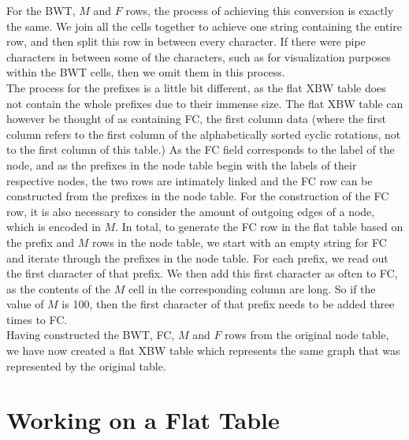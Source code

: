 \documentclass[a4paper,12pt,twoside,BCOR=10mm]{scrbook}
\begin{document}
For the BWT, $ M $ and $ F $ rows, the process of achieving this conversion is exactly the same. 
We join all the cells together to achieve one string containing the entire 
row, and then split this row in between every character. 
If there were pipe characters in between some of the characters, such as 
for visualization purposes within the BWT cells, then we omit them in this process. \\
The process for the prefixes is a little bit different, as the flat XBW table does 
not contain the whole prefixes due to their immense size. 
The flat XBW table can however be thought of as containing FC, the first column data (where 
the first column refers to the first column of the alphabetically sorted cyclic rotations, 
not to the first column of this table.) 
As the FC field corresponds to the label of the node, and as the prefixes in the node table 
begin with the labels of their respective nodes, the two rows are intimately linked 
and the FC row can be constructed from the prefixes in the node table. 
For the construction of the FC row, it is also necessary to consider the amount of 
outgoing edges of a node, which is encoded in $ M $. 
In total, to generate the FC row in the flat table based on the prefix and $ M $ rows in the 
node table, we start with an empty string for FC and iterate through the prefixes in the node table. 
For each prefix, we read out the first character of that prefix. 
We then add this first character as often to FC, as the contents of the $ M $ cell 
in the corresponding column are long. So if the value of $ M $ is 100, 
then the first character of that prefix needs to be added three times to FC. \\
Having constructed the BWT, FC, $ M $ and $ F $ rows from the original node table, 
we have now created a flat XBW table which represents the same graph that was represented 
by the original table.

\section{Working on a Flat Table}
%
\end{document}
